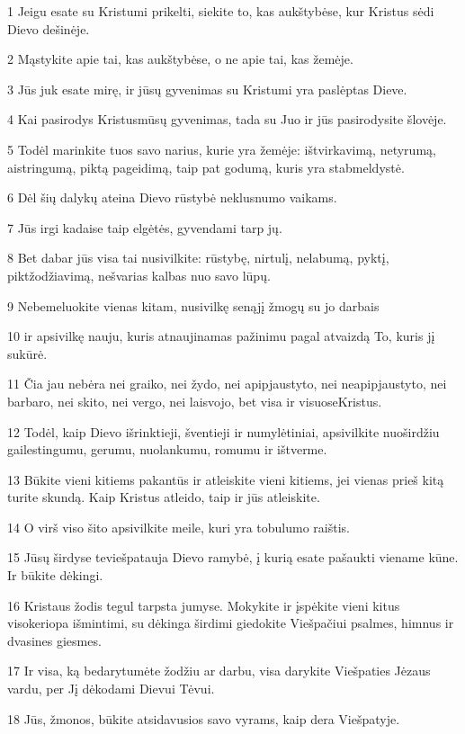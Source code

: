 \par 1 Jeigu esate su Kristumi prikelti, siekite to, kas aukštybėse, kur Kristus sėdi Dievo dešinėje. 
\par 2 Mąstykite apie tai, kas aukštybėse, o ne apie tai, kas žemėje. 
\par 3 Jūs juk esate mirę, ir jūsų gyvenimas su Kristumi yra paslėptas Dieve. 
\par 4 Kai pasirodys Kristus­mūsų gyvenimas, tada su Juo ir jūs pasirodysite šlovėje. 
\par 5 Todėl marinkite tuos savo narius, kurie yra žemėje: ištvirkavimą, netyrumą, aistringumą, piktą pageidimą, taip pat godumą, kuris yra stabmeldystė. 
\par 6 Dėl šių dalykų ateina Dievo rūstybė neklusnumo vaikams. 
\par 7 Jūs irgi kadaise taip elgėtės, gyvendami tarp jų. 
\par 8 Bet dabar jūs visa tai nusivilkite: rūstybę, nirtulį, nelabumą, pyktį, piktžodžiavimą, nešvarias kalbas nuo savo lūpų. 
\par 9 Nebemeluokite vienas kitam, nusivilkę senąjį žmogų su jo darbais 
\par 10 ir apsivilkę nauju, kuris atnaujinamas pažinimu pagal atvaizdą To, kuris jį sukūrė. 
\par 11 Čia jau nebėra nei graiko, nei žydo, nei apipjaustyto, nei neapipjaustyto, nei barbaro, nei skito, nei vergo, nei laisvojo, bet visa ir visuose­Kristus. 
\par 12 Todėl, kaip Dievo išrinktieji, šventieji ir numylėtiniai, apsivilkite nuoširdžiu gailestingumu, gerumu, nuolankumu, romumu ir ištverme. 
\par 13 Būkite vieni kitiems pakantūs ir atleiskite vieni kitiems, jei vienas prieš kitą turite skundą. Kaip Kristus atleido, taip ir jūs atleiskite. 
\par 14 O virš viso šito apsivilkite meile, kuri yra tobulumo raištis. 
\par 15 Jūsų širdyse teviešpatauja Dievo ramybė, į kurią esate pašaukti viename kūne. Ir būkite dėkingi. 
\par 16 Kristaus žodis tegul tarpsta jumyse. Mokykite ir įspėkite vieni kitus visokeriopa išmintimi, su dėkinga širdimi giedokite Viešpačiui psalmes, himnus ir dvasines giesmes. 
\par 17 Ir visa, ką bedarytumėte žodžiu ar darbu, visa darykite Viešpaties Jėzaus vardu, per Jį dėkodami Dievui Tėvui. 
\par 18 Jūs, žmonos, būkite atsidavusios savo vyrams, kaip dera Viešpatyje. 

